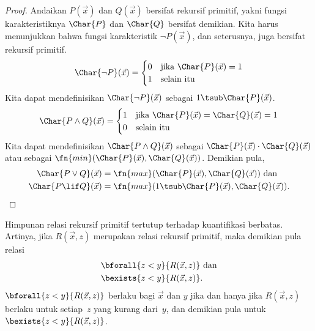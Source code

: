 \documentclass[../../../include/open-logic-section]{subfiles}
\begin{document}
\begin{proof}
  Andaikan $P(\vec x)$ dan $Q(\vec x)$ bersifat rekursif primitif, yakni fungsi
  karakteristiknya $\Char{P}$ dan $\Char{Q}$ bersifat demikian. Kita harus
  menunjukkan bahwa fungsi karakteristik $\lnot P(\vec x)$, dan seterusnya,
  juga bersifat rekursif primitif.
  \[
  \Char{\lnot P}(\vec x) = \begin{cases}
    0 & \text{jika $\Char{P}(\vec x) = 1$}\\
    1 & \text{selain itu}
  \end{cases}
  \]
  Kita dapat mendefinisikan $\Char{\lnot P}(\vec x)$ sebagai
  $1 \tsub \Char{P}(\vec x)$.
  \[
  \Char{P \land Q}(\vec x) = \begin{cases}
    1 & \text{jika $\Char{P}(\vec x) = \Char{Q}(\vec x) = 1$}\\
    0 & \text{selain itu}
  \end{cases}
  \]
  Kita dapat mendefinisikan $\Char{P \land Q}(\vec x)$ sebagai
  $\Char{P}(\vec x) \cdot \Char{Q}(\vec x)$ atau sebagai
  $\fn{min}(\Char{P}(\vec x), \Char{Q}(\vec x))$. Demikian pula,
  \begin{align*}
    \Char{P \lor Q}(\vec x) & = \fn{max}(\Char{P}(\vec x), \Char{Q}(\vec x)) \text{ dan}\\
    \Char{P \lif Q}(\vec x) & = \fn{max}(1 \tsub
  \Char{P}(\vec x), \Char{Q}(\vec x)).
  \end{align*}
\end{proof}

\begin{prop}
  Himpunan relasi rekursif primitif tertutup terhadap kuantifikasi berbatas.
  Artinya, jika $R(\vec x, z)$ merupakan relasi rekursif primitif, maka
  demikian pula relasi
  \begin{align*}
    & \bforall{z < y}{R(\vec x, z)} \text{ dan}\\
    & \bexists{z < y}{R(\vec x, z)}.
  \end{align*}
  $\bforall{z < y}{R(\vec x, z)}$ berlaku bagi $\vec x$ dan $y$ jika dan hanya
  jika $R(\vec x, z)$ berlaku untuk setiap~$z$ yang kurang dari~$y$, dan
  demikian pula untuk $\bexists{z < y}{R(\vec x, z)}$.
\end{prop}
\end{document}
